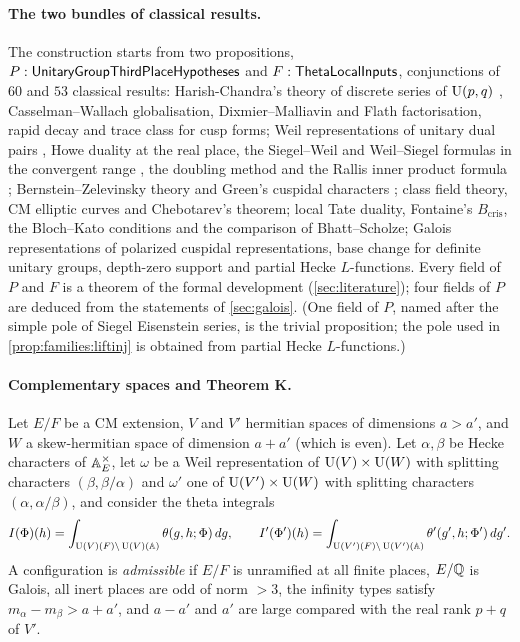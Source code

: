 \paragraph{The two bundles of classical results.}
The construction starts from two propositions,
$P:\mathsf{UnitaryGroupThirdPlaceHypotheses}$ and $F:\mathsf{ThetaLocalInputs}$, conjunctions of $60$ and $53$
classical results: Harish-Chandra's theory of discrete series of $\operatorname{U}(p,q)$
\cite{HarishChandra1966,HarishChandra1968}, Casselman--Wallach globalisation, Dixmier--Malliavin and Flath
factorisation, rapid decay and trace class for cusp forms; Weil representations of unitary dual pairs
\cite{Kudla1994}, Howe duality at the real place, the Siegel--Weil and Weil--Siegel formulas in the convergent
range \cite{Weil1965,KudlaRallis1988,Ichino2004}, the doubling method \cite{GelbartPiatetskiShapiroRallis1987} and
the Rallis inner product formula \cite{Rallis1984}; Bernstein--Zelevinsky theory and Green's cuspidal characters
\cite{Green1955}; class field theory, CM elliptic curves and Chebotarev's theorem; local Tate duality, Fontaine's
$B_{\mathrm{cris}}$, the Bloch--Kato conditions and the comparison of Bhatt--Scholze; Galois representations of
polarized cuspidal representations, base change for definite unitary groups, depth-zero support and partial
Hecke $L$-functions. Every field of $P$ and $F$ is a theorem of the formal development (\cref{sec:literature});
four fields of $P$ are deduced from the statements of \cref{sec:galois}. (One field of $P$, named after the simple
pole of Siegel Eisenstein series, is the trivial proposition; the pole used in \cref{prop:families:liftinj} is
obtained from partial Hecke $L$-functions.)

\paragraph{Complementary spaces and Theorem K.}
Let $E/F$ be a CM extension, $V$ and $V'$ hermitian spaces of dimensions $a>a'$, and $W$ a skew-hermitian
space of dimension $a+a'$ (which is even). Let $\alpha,\beta$ be Hecke characters of $\mathbb{A}_E^\times$, let $\omega$
be a Weil representation of $\operatorname{U}(V)\times\operatorname{U}(W)$ with splitting characters $(\beta,\beta/\alpha)$ and
$\omega'$ one of $\operatorname{U}(V')\times\operatorname{U}(W)$ with splitting characters $(\alpha,\alpha/\beta)$, and consider the
theta integrals
\[
I(\Phi)(h)=\int_{\operatorname{U}(V)(F)\backslash\operatorname{U}(V)(\mathbb{A})}\theta(g,h;\Phi)\,dg,\qquad
I'(\Phi')(h)=\int_{\operatorname{U}(V')(F)\backslash\operatorname{U}(V')(\mathbb{A})}\theta'(g',h;\Phi')\,dg'.
\]
A configuration is \emph{admissible} if $E/F$ is unramified at all finite places, $E/\mathbb{Q}$ is Galois, all inert
places are odd of norm $>3$, the infinity types satisfy $m_\alpha-m_\beta>a+a'$, and $a-a'$ and $a'$ are large
compared with the real rank $p+q$ of $V'$.

